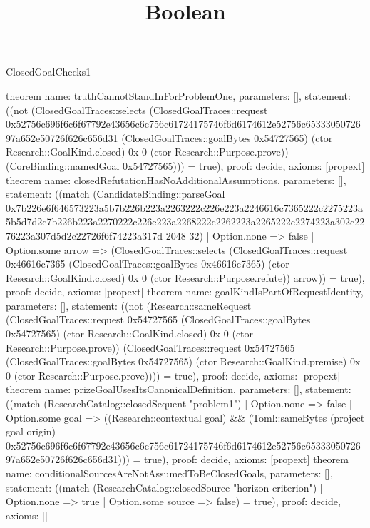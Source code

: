 \begin{lexlean}{ClosedGoalChecks1}
\title{Boolean}
\begin{semanticmodule}
theorem{
 name: truthCannotStandInForProblemOne,
 parameters: [],
 statement: ((not (ClosedGoalTraces::selects (ClosedGoalTraces::request 0x52756c696f6c6f67792e43656c6c756c61724175746f6d6174612e52756c6533305072697a652e50726f626c656d31 (ClosedGoalTraces::goalBytes 0x54727565) (ctor Research::GoalKind.closed) 0x 0 (ctor Research::Purpose.prove)) (CoreBinding::namedGoal 0x54727565))) = true),
 proof: decide{},
 axioms: [propext]
}
theorem{
 name: closedRefutationHasNoAdditionalAssumptions,
 parameters: [],
 statement: ((match (CandidateBinding::parseGoal 0x7b226e6f646573223a5b7b226b223a2263222c226e223a2246616c7365222c2275223a5b5d7d2c7b226b223a2270222c226e223a2268222c2262223a2265222c2274223a302c2276223a307d5d2c22726f6f74223a317d 2048 32) | Option.none => false | Option.some arrow => (ClosedGoalTraces::selects (ClosedGoalTraces::request 0x46616c7365 (ClosedGoalTraces::goalBytes 0x46616c7365) (ctor Research::GoalKind.closed) 0x 0 (ctor Research::Purpose.refute)) arrow)) = true),
 proof: decide{},
 axioms: [propext]
}
theorem{
 name: goalKindIsPartOfRequestIdentity,
 parameters: [],
 statement: ((not (Research::sameRequest (ClosedGoalTraces::request 0x54727565 (ClosedGoalTraces::goalBytes 0x54727565) (ctor Research::GoalKind.closed) 0x 0 (ctor Research::Purpose.prove)) (ClosedGoalTraces::request 0x54727565 (ClosedGoalTraces::goalBytes 0x54727565) (ctor Research::GoalKind.premise) 0x 0 (ctor Research::Purpose.prove)))) = true),
 proof: decide{},
 axioms: [propext]
}
theorem{
 name: prizeGoalUsesItsCanonicalDefinition,
 parameters: [],
 statement: ((match (ResearchCatalog::closedSequent "problem1") | Option.none => false | Option.some goal => ((Research::contextual goal) && (Toml::sameBytes (project goal origin) 0x52756c696f6c6f67792e43656c6c756c61724175746f6d6174612e52756c6533305072697a652e50726f626c656d31))) = true),
 proof: decide{},
 axioms: [propext]
}
theorem{
 name: conditionalSourcesAreNotAssumedToBeClosedGoals,
 parameters: [],
 statement: ((match (ResearchCatalog::closedSource "horizon-criterion") | Option.none => true | Option.some source => false) = true),
 proof: decide{},
 axioms: []
}
\end{semanticmodule}
\end{lexlean}
